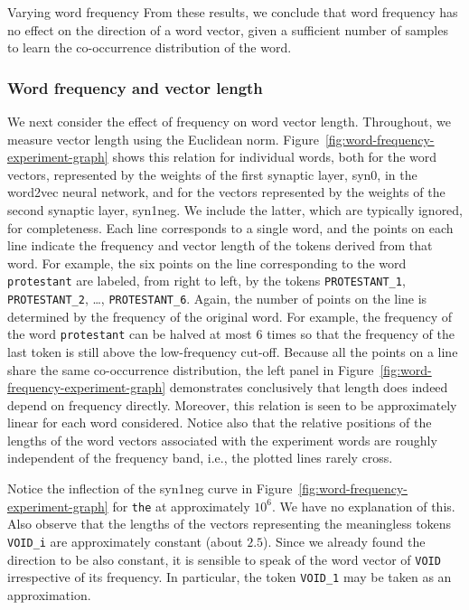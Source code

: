 \documentclass{article} %
\newcommand{\word}[1]{\texttt{#1}}
\begin{document}
\begin{section}{Varying word frequency}
From these results, we conclude that word frequency has no effect on the
direction of a word vector, given a sufficient number of samples to
learn the co-occurrence distribution of the word.

\subsubsection{Word frequency and vector length}
We next consider the effect of frequency on word vector length.
Throughout, we measure vector length using the Euclidean norm.
Figure~\ref{fig:word-frequency-experiment-graph} shows this relation for
individual words, both for the word vectors, represented by the weights
of the first synaptic layer, syn0, in the word2vec neural network, and
for the vectors represented by the weights of the second synaptic layer,
syn1neg.  We include the latter, which are typically ignored, for
completeness.  Each line corresponds to a single word, and the points on
each line indicate the frequency and vector length of the tokens derived
from that word.  For example, the six points on the line corresponding
to the word \word{protestant} are labeled, from right to left, by the
tokens \word{PROTESTANT\_1}, \word{PROTESTANT\_2}, \dots,
\word{PROTESTANT\_6}.  Again, the number of points on the line is
determined by the frequency of the original word.  For example, the
frequency of the word \word{protestant} can be halved at most $6$ times
so that the frequency of the last token is still above the low-frequency
cut-off.  Because all the points on a line share the same co-occurrence
distribution, the left panel in
Figure~\ref{fig:word-frequency-experiment-graph} demonstrates
conclusively that length does indeed depend on frequency directly.
Moreover, this relation is seen to be approximately linear for each word
considered.  Notice also that the relative positions of the lengths of
the word vectors associated with the experiment words are roughly
independent of the frequency band, i.e., the plotted lines rarely cross.

Notice the inflection of the syn1neg curve in
Figure~\ref{fig:word-frequency-experiment-graph} for \word{the} at
approximately $10^6$.  We have no explanation of this.  Also observe
that the lengths of the vectors representing the meaningless tokens
\word{VOID\_i} are approximately constant (about $2.5$).  Since we
already found the direction to be also constant, it is sensible to speak
of the word vector of \word{VOID} irrespective of its frequency.  In
particular, the token \word{VOID\_1} may be taken as an approximation.


\end{section}
\end{document}
